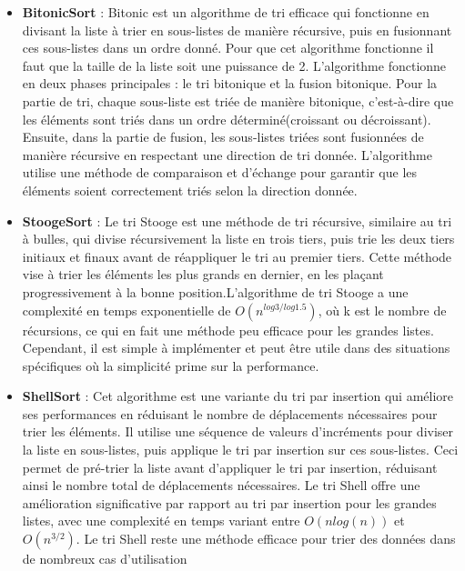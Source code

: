 \documentclass[a4paper,12pt]{article}
\begin{document}
\begin{itemize}
\item \textbf{BitonicSort} : Bitonic est un algorithme de tri efficace qui fonctionne en divisant la liste à trier en sous-listes de manière récursive, puis en fusionnant ces sous-listes dans un ordre donné. Pour que cet algorithme fonctionne il faut que la taille de la liste soit une puissance de 2. L'algorithme fonctionne en deux phases principales : le tri bitonique et la fusion bitonique. Pour la partie de tri, chaque sous-liste est triée de manière bitonique, c'est-à-dire que les éléments sont triés dans un ordre déterminé(croissant ou décroissant). Ensuite, dans la partie de fusion, les sous-listes triées sont fusionnées de manière récursive en respectant une direction de tri donnée. L'algorithme utilise une méthode de comparaison et d'échange pour garantir que les éléments soient correctement triés selon la direction donnée. \\

\item \textbf{StoogeSort} : Le tri Stooge est une méthode de tri récursive, similaire au tri à bulles, qui divise récursivement la liste en trois tiers, puis trie les deux tiers initiaux et finaux avant de réappliquer le tri au premier tiers. Cette méthode vise à trier les éléments les plus grands en dernier, en les plaçant progressivement à  la bonne position.L'algorithme de tri Stooge a une complexité en temps exponentielle de $O(n^{log{3}/log{1.5}})$, où k est le nombre de récursions, ce qui en fait une méthode peu efficace pour les grandes listes. Cependant, il est simple à implémenter et peut être utile dans des situations spécifiques où la simplicité prime sur la performance.\\

\item \textbf{ShellSort} : Cet algorithme est une variante du tri par insertion qui améliore ses performances en réduisant le nombre de déplacements nécessaires pour trier les éléments. Il utilise une séquence de valeurs d'incréments pour diviser la liste en sous-listes, puis applique le tri par insertion sur ces sous-listes. Ceci permet de pré-trier la liste avant d'appliquer le tri par insertion, réduisant ainsi le nombre total de déplacements nécessaires. Le tri Shell offre une amélioration significative par rapport au tri par insertion pour les grandes listes, avec une complexité en temps variant entre $O(n log (n))$ et $O(n^{3/2})$. Le tri Shell reste une méthode efficace pour trier des données dans de nombreux cas d'utilisation\\


\end{itemize}
\end{document}
